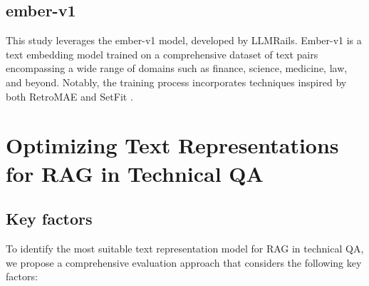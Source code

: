 \subsection{ember-v1}
This study leverages the ember-v1 model, developed by LLMRails.
Ember-v1 is a text embedding model trained on a comprehensive dataset of text pairs encompassing a wide range of domains such as finance, science, medicine, law, and beyond.
Notably, the training process incorporates techniques inspired by both RetroMAE \cite{RetroMAE} and SetFit \cite{tunstall2022efficient}. 









%

\section{Optimizing Text Representations for RAG in Technical QA}

\subsection{Key factors}
To identify the most suitable text representation model for \ac{RAG} in technical \ac{QA}, we propose a comprehensive evaluation approach that considers the following key factors:


